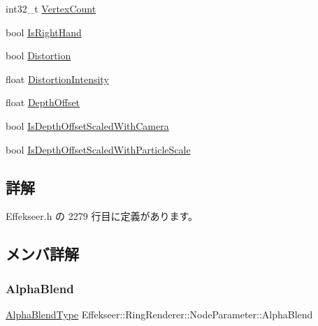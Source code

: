 \begin{DoxyCompactItemize}
\item 
int32\+\_\+t \mbox{\hyperlink{struct_effekseer_1_1_ring_renderer_1_1_node_parameter_a25fe9b429b69811b492894d938df31a7}{Vertex\+Count}}
\item 
bool \mbox{\hyperlink{struct_effekseer_1_1_ring_renderer_1_1_node_parameter_af7487f0fad4be89535f67b8927c3bf67}{Is\+Right\+Hand}}
\item 
bool \mbox{\hyperlink{struct_effekseer_1_1_ring_renderer_1_1_node_parameter_a0a2ba718e4b716c3959216d5e22758a3}{Distortion}}
\item 
float \mbox{\hyperlink{struct_effekseer_1_1_ring_renderer_1_1_node_parameter_a533b7d84f37defe0accbcfaeb2a4ed50}{Distortion\+Intensity}}
\item 
float \mbox{\hyperlink{struct_effekseer_1_1_ring_renderer_1_1_node_parameter_a653a2891300dca269562fc68e55eb2e4}{Depth\+Offset}}
\item 
bool \mbox{\hyperlink{struct_effekseer_1_1_ring_renderer_1_1_node_parameter_a2c32d13c1ffbe118b59348986daba290}{Is\+Depth\+Offset\+Scaled\+With\+Camera}}
\item 
bool \mbox{\hyperlink{struct_effekseer_1_1_ring_renderer_1_1_node_parameter_ae917bd956f2a24b7b387b80edf047604}{Is\+Depth\+Offset\+Scaled\+With\+Particle\+Scale}}
\end{DoxyCompactItemize}


\subsection{詳解}


 Effekseer.\+h の 2279 行目に定義があります。



\subsection{メンバ詳解}
\mbox{\label{struct_effekseer_1_1_ring_renderer_1_1_node_parameter_a73f862f36c32e13c7e3109be755acad3}} 
\subsubsection{\texorpdfstring{Alpha\+Blend}{AlphaBlend}}
{\footnotesize\ttfamily \mbox{\hyperlink{namespace_effekseer_a8c32fd5b7ec7feed73314b2ae8086949}{Alpha\+Blend\+Type}} Effekseer\+::\+Ring\+Renderer\+::\+Node\+Parameter\+::\+Alpha\+Blend}



